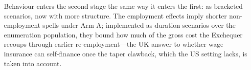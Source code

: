 Behaviour enters the second stage the same way it enters the first:
as bracketed scenarios, now with more structure. The
\citet{hyman2024} employment effects imply shorter non-employment spells
under Arm A; implemented as duration scenarios over the enumeration
population, they bound how much of the gross cost the Exchequer recoups
through earlier re-employment---the UK answer to whether wage insurance
can self-finance once the taper clawback, which the US setting lacks, is
taken into account.
